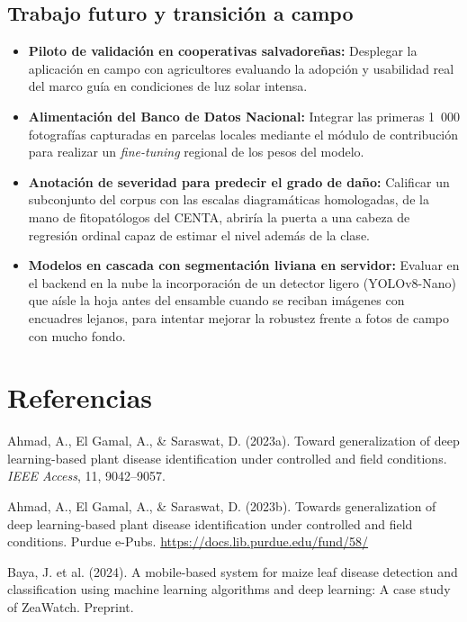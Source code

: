 \documentclass[12pt,letterpaper]{article}
\begin{document}
\subsection{Trabajo futuro y transici\'on a campo}

\begin{itemize}
\item \textbf{Piloto de validaci\'on en cooperativas salvadore\~nas:} Desplegar la aplicaci\'on en campo con agricultores evaluando la adopci\'on y usabilidad real del marco gu\'ia en condiciones de luz solar intensa.
\item \textbf{Alimentaci\'on del Banco de Datos Nacional:} Integrar las primeras 1~000 fotograf\'ias capturadas en parcelas locales mediante el m\'odulo de contribuci\'on para realizar un \textit{fine-tuning} regional de los pesos del modelo.
\item \textbf{Anotaci\'on de severidad para predecir el grado de da\~no:} Calificar un subconjunto del corpus con las escalas diagram\'aticas homologadas, de la mano de fitopat\'ologos del CENTA, abrir\'ia la puerta a una cabeza de regresi\'on ordinal capaz de estimar el nivel adem\'as de la clase.
\item \textbf{Modelos en cascada con segmentaci\'on liviana en servidor:} Evaluar en el backend en la nube la incorporaci\'on de un detector ligero (YOLOv8-Nano) que a\'isle la hoja antes del ensamble cuando se reciban im\'agenes con encuadres lejanos, para intentar mejorar la robustez frente a fotos de campo con mucho fondo.
\end{itemize}

\newpage

\section{Referencias}

\noindent\hangindent=1.27cm
Ahmad, A., El Gamal, A., \& Saraswat, D. (2023a). Toward generalization of deep learning-based plant disease identification under controlled and field conditions. \textit{IEEE Access}, 11, 9042--9057.

\par\bigskip
\noindent\hangindent=1.27cm
Ahmad, A., El Gamal, A., \& Saraswat, D. (2023b). Towards generalization of deep learning-based plant disease identification under controlled and field conditions. Purdue e-Pubs. \url{https://docs.lib.purdue.edu/fund/58/}

\par\bigskip
\noindent\hangindent=1.27cm
Baya, J. et al. (2024). A mobile-based system for maize leaf disease detection and classification using machine learning algorithms and deep learning: A case study of ZeaWatch. Preprint.
\end{document}
